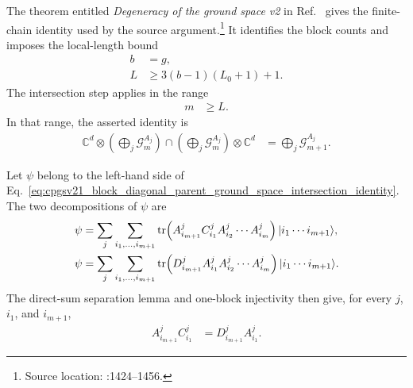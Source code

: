 \documentclass{article}
\begin{document}
The theorem entitled \emph{Degeneracy of the ground space v2} in
Ref.~\cite{PerezGarcia2007MPSReps} gives the finite-chain identity used by the
source argument.\footnote{Source location:
:1424--1456.}
It identifies the block counts and imposes the local-length bound
\begin{align}
  b
    &=
    g,
  \label{eq:cpgsv21_block_diagonal_parent_ground_space_block_count}\\
  L
    &\geq
    3(b-1)(L_0+1)+1.
  \label{eq:cpgsv21_block_diagonal_parent_ground_space_local_length}
\end{align}
The intersection step applies in the range
\begin{align}
  m
    &\geq
    L.
  \label{eq:cpgsv21_block_diagonal_parent_ground_space_intersection_range}
\end{align}
In that range, the asserted identity is
\begin{align}
  \mathbb C^d\otimes
  \left(\bigoplus_j\mathcal G_m^{A_j}\right)
  \cap
  \left(\bigoplus_j\mathcal G_m^{A_j}\right)\otimes\mathbb C^d
    &=
    \bigoplus_j\mathcal G_{m+1}^{A_j}.
  \label{eq:cpgsv21_block_diagonal_parent_ground_space_intersection_identity}
\end{align}

Let $\psi$ belong to the left-hand side of
Eq.~\ref{eq:cpgsv21_block_diagonal_parent_ground_space_intersection_identity}.
The two decompositions of $\psi$ are
\begin{align}
  \psi
    &=
    \sum_j\sum_{i_1,\ldots,i_{m+1}}
    \operatorname{tr}\!\left(A^j_{i_{m+1}}C^j_{i_1}
      A^j_{i_2}\cdots A^j_{i_m}\right)
    |i_1\cdots i_{m+1}\rangle,
  \label{eq:cpgsv21_block_diagonal_parent_ground_space_left_decomposition}\\
  \psi
    &=
    \sum_j\sum_{i_1,\ldots,i_{m+1}}
    \operatorname{tr}\!\left(D^j_{i_{m+1}}A^j_{i_1}
      A^j_{i_2}\cdots A^j_{i_m}\right)
    |i_1\cdots i_{m+1}\rangle.
  \label{eq:cpgsv21_block_diagonal_parent_ground_space_right_decomposition}
\end{align}
The direct-sum separation lemma and one-block injectivity then give, for every
$j$, $i_1$, and $i_{m+1}$,
\begin{align}
  A^j_{i_{m+1}}C^j_{i_1}
    &=
    D^j_{i_{m+1}}A^j_{i_1}.
  \label{eq:cpgsv21_block_diagonal_parent_ground_space_cd_identity}
\end{align}
\end{document}
